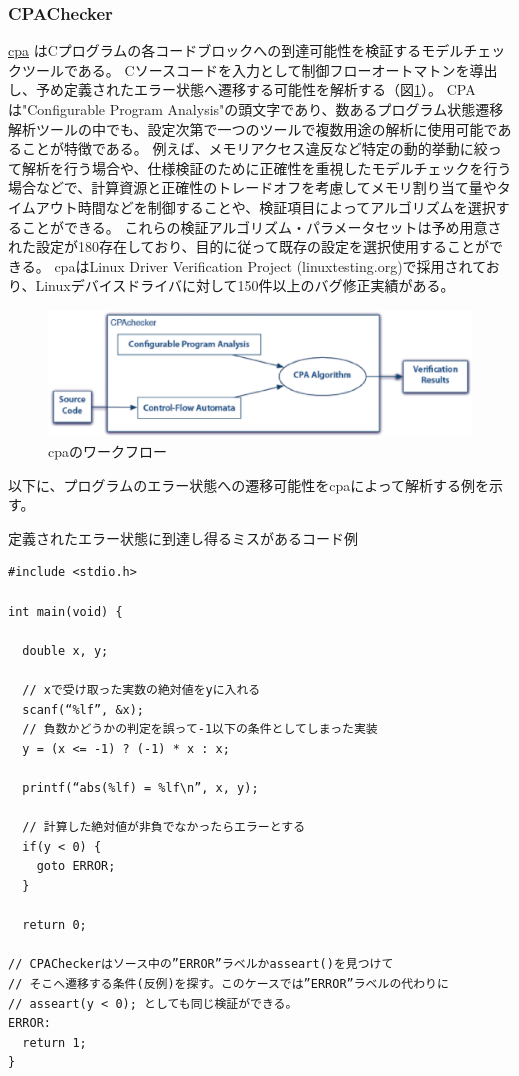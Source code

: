 \subsubsection{CPAChecker}
\href{http://cpachecker.sosy-lab.org/}{\acrshort{cpa}} \cite{cpa}はCプログラムの各コードブロックへの到達可能性を検証するモデルチェックツールである。
Cソースコードを入力として制御フローオートマトンを導出し、予め定義されたエラー状態へ遷移する可能性を解析する（図\ref{cpa}）。
CPAは"Configurable Program Analysis"の頭文字であり、数あるプログラム状態遷移解析ツールの中でも、設定次第で一つのツールで複数用途の解析に使用可能であることが特徴である。
例えば、メモリアクセス違反など特定の動的挙動に絞って解析を行う場合や、仕様検証のために正確性を重視したモデルチェックを行う場合などで、計算資源と正確性のトレードオフを考慮してメモリ割り当て量やタイムアウト時間などを制御することや、検証項目によってアルゴリズムを選択することができる。
これらの検証アルゴリズム・パラメータセットは予め用意された設定が180存在しており、目的に従って既存の設定を選択使用することができる。
\acrshort{cpa}はLinux Driver Verification Project (linuxtesting.org)で採用されており、Linuxデバイスドライバに対して150件以上のバグ修正実績がある。
\begin{figure}[ht]
  \centering
  \includegraphics[width=\textwidth]{pic/cpa.eps}
  \caption{\acrshort{cpa}のワークフロー}
  \label{cpa}
\end{figure}
\par
以下に、プログラムのエラー状態への遷移可能性を\acrshort{cpa}によって解析する例を示す。
\begin{itembox}[l]{定義されたエラー状態に到達し得るミスがあるコード例}
\begin{verbatim}
#include <stdio.h>

int main(void) {

  double x, y;

  // xで受け取った実数の絶対値をyに入れる
  scanf(“%lf”, &x);
  // 負数かどうかの判定を誤って-1以下の条件としてしまった実装
  y = (x <= -1) ? (-1) * x : x;

  printf(“abs(%lf) = %lf\n”, x, y);

  // 計算した絶対値が非負でなかったらエラーとする
  if(y < 0) {
    goto ERROR;
  }

  return 0;

// CPACheckerはソース中の”ERROR”ラベルかasseart()を見つけて
// そこへ遷移する条件(反例)を探す。このケースでは”ERROR”ラベルの代わりに
// asseart(y < 0); としても同じ検証ができる。
ERROR:
  return 1;
}
\end{verbatim}
\end{itembox}
